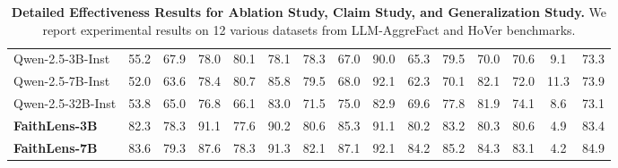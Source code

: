 \begin{table}[!t]
{\begin{tabular}{lcccccccccccccc}
\hdashline[2pt/3pt]
Qwen-2.5-3B-Inst & 55.2&67.9&78.0&80.1&78.1&78.3&67.0 &90.0 &65.3 &79.5 &70.0&70.6&9.1 &73.3  \\
Qwen-2.5-7B-Inst & 52.0&63.6&78.4&80.7&85.8&79.5&68.0 &92.1 &62.3& 70.1 &82.1&72.0&11.3 &73.9  \\
Qwen-2.5-32B-Inst & 53.8&65.0&76.8&66.1&83.0&71.5&75.0&82.9&69.6&77.8&81.9&74.1&8.6 &73.1  \\
\rowcolor{blue!5} \textbf{FaithLens-3B}& {82.3}&{78.3}&{91.1}&{77.6}&{90.2}&{80.6}&{85.3}&{91.1}&{80.2}&{83.2}&{80.3}&{80.6}&{4.9} &{83.4}  \\
\rowcolor{blue!5} \textbf{FaithLens-7B}&  {83.6} & {79.3} & {87.6} & {78.3} & {91.3} & {82.1} & {87.1} & {92.1} & {84.2} & {85.2} & {84.3} & {83.1} & {4.2} &{84.9}  \\
\bottomrule
\end{tabular}}
\caption{\textbf{Detailed Effectiveness Results for Ablation Study, Claim Study, and Generalization Study.}
We report experimental results on 12 various datasets from LLM-AggreFact and HoVer benchmarks.}
\label{tb:detail_main}
\end{table}

